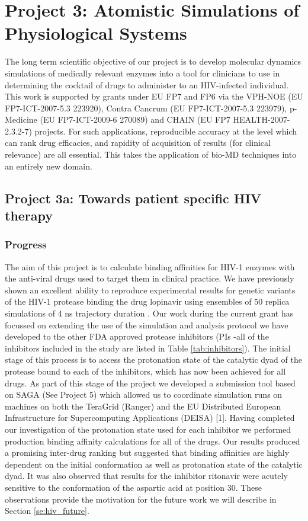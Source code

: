 \documentclass[a4paper,12pt]{article}
\begin{document}
\section{Project 3: Atomistic Simulations of Physiological Systems}

The long term scientific objective of our project is to develop molecular dynamics simulations of 
medically relevant enzymes into a tool for clinicians to use in determining the cocktail of drugs to 
administer to an HIV-infected individual. This work is supported by grants under EU FP7 and FP6 
via the VPH-NOE (EU FP7-ICT-2007-5.3 223920), Contra Cancrum (EU FP7-ICT-2007-5.3 223979), 
p-Medicine (EU FP7-ICT-2009-6 270089) and CHAIN (EU FP7 HEALTH-2007-2.3.2-7) projects. For such 
applications, reproducible accuracy at the level which can rank drug efficacies, and rapidity 
of acquisition of results (for clinical relevance) are all essential. This takes the application 
of bio-MD techniques into an entirely new domain.

\subsection{Project 3a: Towards patient specific HIV therapy}

\subsubsection{Progress}

The aim of this project is to calculate binding affinities for HIV-1 enzymes with the anti-viral 
drugs used to target them in clinical practice. We have previously shown an excellent ability to
reproduce experimental results for genetic variants of the HIV-1 protease binding the drug 
lopinavir using ensembles of 50 replica simulations of 4 ns trajectory duration \cite{Sadiq2010}. 
Our work during the current grant has focussed on extending the use of the simulation and analysis 
protocol we have developed to the other FDA approved protease inhibitors (PIs -all of the inhibitors 
included in the study are listed in Table \ref{tab:inhibitors}). 
The initial stage of this process is to access the protonation state of the catalytic dyad of the 
protease bound to each of the inhibitors, which has now been achieved for all drugs. As part of this 
stage of the project we developed a submission tool based on SAGA (See Project 5) which allowed us 
to coordinate simulation runs on machines on both the TeraGrid (Ranger) and the EU Distributed 
European Infrastructure for Supercomputing Applications (DEISA) [1]. Having completed our investigation 
of the protonation state used for each inhibitor we performed production binding affinity calculations 
for all of the drugs. Our results produced a promising inter-drug ranking but 
suggested that binding affinities are highly dependent on the initial conformation as well as protonation 
state of the catalytic dyad. It was also observed that results for the inhibitor ritonavir were acutely 
sensitive to the conformation of the aspartic acid at position 30. These observations provide the 
motivation for the future work we will describe in Section \ref{se:hiv_future}.
\end{document}

